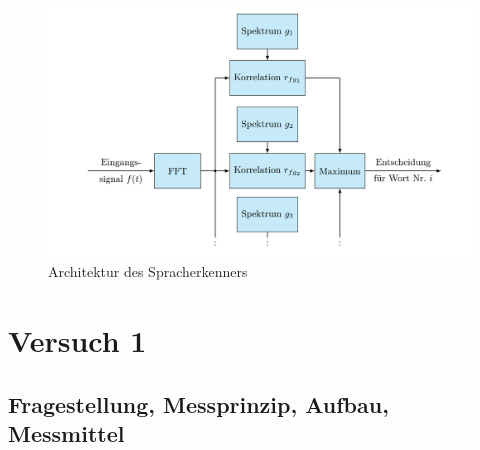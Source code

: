 \documentclass[12pt, oneside, a4paper, \docLanguage]{report}
\begin{document}
\begin{figure}[H]
	\centering
	\includegraphics[width=.9\linewidth]{media/archi.png}
	\caption{Architektur des Spracherkenners}
	\label{img:Architektur des Spracherkenners}
\end{figure}
%
%
\chapter{Versuch 1}
\label{chap:VERSUCH_1}

\section{Fragestellung, Messprinzip, Aufbau, Messmittel}
\label{chap:VERSUCH_1_FRAGESTELLUNG}
\end{document}
